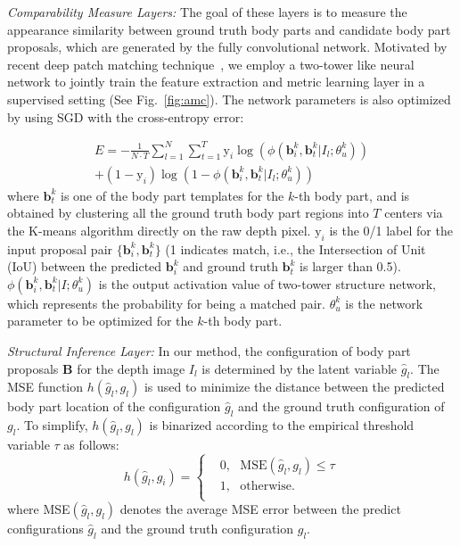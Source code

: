 \documentclass{sig-alternate-05-2015}
\begin{document}
\emph{Comparability Measure Layers:}
The goal of these layers is to measure the appearance similarity between ground truth body parts and candidate body part proposals, which are generated by the fully convolutional network. Motivated by recent deep patch matching technique~\cite{mn15cvpr}, we employ a two-tower like neural network to jointly train the feature extraction and metric learning layer in a supervised setting (See Fig.~\ref{fig:amc}). The network parameters is also optimized by using SGD with the cross-entropy error:

\begin{equation}
\label{equ:am}
\begin{aligned}
E=-\frac{1}{N \cdot T} \sum_{l=1}^N \sum_{ t=1}^T \text{y}_i\log\left(\phi(\mathbf{b}_i^k, \mathbf{b}_t^k| I_l; \theta_u^k) \right) \\
+ ( 1 - \text{y}_i ) \log \left( 1 - \phi(\mathbf{b}_i^k, \mathbf{b}_t^k|I_l;\theta_u^k ) \right)
\end{aligned}
\end{equation}
where $\mathbf{b}_t^k$ is one of the body part templates for the $k$-th body part, and is obtained by clustering all the ground truth body part regions into $T$ centers via the K-means algorithm directly on the raw depth pixel. $\text{y}_i$ is the 0/1 label for the input proposal pair $\{ \mathbf{b}_i^k, \mathbf{b}_t^k\}$ (1 indicates match, i.e., the Intersection of Unit (IoU) between the predicted $\mathbf{b}_i^k$ and ground truth $\mathbf{b}_t^k$ is larger than 0.5). $\phi(\mathbf{b}_i^k, \mathbf{b}_t^k| I; \theta_u^k)$ is the output activation value of two-tower structure network, which represents the probability for being a matched pair. $\theta_u^k$ is the network parameter to be optimized for the $k$-th body part. 


\emph{Structural Inference Layer:} In our method, the configuration of body part proposals $\mathbf{B}$ for the depth image $I_l$ is determined by the latent variable $\hat{g}_l$. The MSE function $h(\hat{g}_l, g_l)$ is used to minimize the distance between the predicted body part location of the configuration $\hat{g}_l$ and the ground truth configuration of $g_l$. To simplify, $h(\hat{g}_l, g_l)$ is binarized according to the empirical threshold variable $\tau$ as follows:
\begin{equation}
h(\hat{g}_l, g_i) = \left\lbrace
\begin{aligned}
&0, ~~~\text{MSE}( \hat{g}_l, g_l ) \le \tau \\
&1, ~~~\text{otherwise.} \\
\end{aligned} \right.
\end{equation}
where MSE$( \hat{g}_l, g_l )$ denotes the average MSE error between the predict configurations $\hat{g}_l$ and the ground truth configuration $g_l$.
\end{document}
